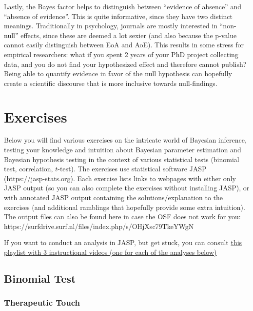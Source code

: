 \documentclass[
  letterpaper,
  DIV=11,
  numbers=noendperiod]{scrreprt}
\begin{document}
Lastly, the Bayes factor helps to distinguish between ``evidence of
absence'' and ``absence of evidence''. This is quite informative, since
they have two distinct meanings. Traditionally in psychology, journals
are mostly interested in ``non-null'' effects, since these are deemed a
lot sexier (and also because the p-value cannot easily distinguish
between EoA and AoE). This results in some stress for empirical
researchers: what if you spent 2 years of your PhD project collecting
data, and you do not find your hypothesized effect and therefore cannot
publish? Being able to quantify evidence in favor of the null hypothesis
can hopefully create a scientific discourse that is more inclusive
towards null-findings.


\hypertarget{exercises}{%
\chapter{Exercises}\label{exercises}}

Below you will find various exercises on the intricate world of Bayesian
inference, testing your knowledge and intuition about Bayesian parameter
estimation and Bayesian hypothesis testing in the context of various
statistical tests (binomial test, correlation, \(t\)-test). The
exercises use statistical software JASP (https://jasp-stats.org). Each
exercise lists links to webpages with either only JASP output (so you
can also complete the exercises without installing JASP), or with
annotated JASP output containing the solutions/explanation to the
exercises (and additional ramblings that hopefully provide some extra
intuition). The output files can also be found here in case the OSF does
not work for you:
https://surfdrive.surf.nl/files/index.php/s/OHjXsc79TkeYWgN

If you want to conduct an analysis in JASP, but get stuck, you can
consult
\href{https://youtube.com/playlist?list=PLWPa8RxHarcOyxhMAk_RMT9h_GYHCrgGQ}{this
playlist with 3 instructional videos (one for each of the analyses
below)}

\hypertarget{binomial-test}{%
\section{Binomial Test}\label{binomial-test}}

\hypertarget{therapeutic-touch}{%
\subsection{Therapeutic Touch}\label{therapeutic-touch}}
\end{document}
